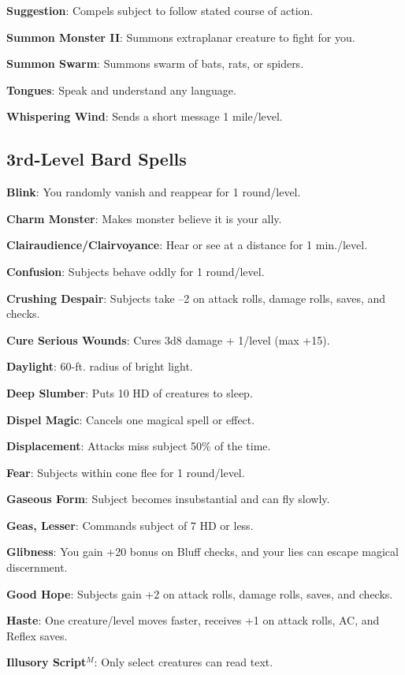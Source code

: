 \textbf{Suggestion}: Compels subject to follow stated course of action.

\textbf{Summon Monster II}: Summons extraplanar creature to fight for you.

\textbf{Summon Swarm}: Summons swarm of bats, rats, or spiders.

\textbf{Tongues}: Speak and understand any language.

\textbf{Whispering Wind}: Sends a short message 1 mile/level.

\subsection{3rd-Level Bard Spells}


\textbf{Blink}: You randomly vanish and reappear for 1 round/level.

\textbf{Charm Monster}: Makes monster believe it is your ally.

\textbf{Clairaudience/Clairvoyance}: Hear or see at a distance for 1 min./level.

\textbf{Confusion}: Subjects behave oddly for 1 round/level.

\textbf{Crushing Despair}: Subjects take --2 on attack rolls, damage rolls, saves, and checks.

\textbf{Cure Serious Wounds}: Cures 3d8 damage + 1/level (max +15).

\textbf{Daylight}: 60-ft. radius of bright light.

\textbf{Deep Slumber}: Puts 10 HD of creatures to sleep.

\textbf{Dispel Magic}: Cancels one magical spell or effect.

\textbf{Displacement}: Attacks miss subject 50\% of the time.

\textbf{Fear}: Subjects within cone flee for 1 round/level.

\textbf{Gaseous Form}: Subject becomes insubstantial and can fly slowly.

\textbf{Geas, Lesser}: Commands subject of 7 HD or less.

\textbf{Glibness}: You gain +20 bonus on Bluff checks, and your lies can escape magical discernment.

\textbf{Good Hope}: Subjects gain +2 on attack rolls, damage rolls, saves, and checks.

\textbf{Haste}: One creature/level moves faster, receives +1 on attack rolls, AC, and Reflex saves.

\textbf{Illusory Script}\(^{M}\): Only select creatures can read text.

